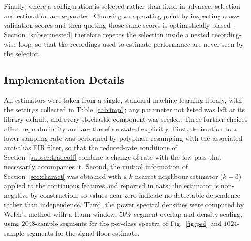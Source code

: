 Finally, where a configuration is selected rather than fixed in advance, selection
and estimation are separated. Choosing an operating point by inspecting
cross-validation scores and then quoting those same scores is optimistically
biased~\cite{qi2019cv}; Section~\ref{subsec:nested} therefore repeats the
selection inside a nested recording-wise loop, so that the recordings used to
estimate performance are never seen by the selector.

\subsection{Implementation Details}
\label{subsec:impl}
All estimators were taken from a single, standard machine-learning library, with
the settings collected in Table~\ref{tab:impl}; any parameter not listed was left
at its library default, and every stochastic component was seeded. Three further
choices affect reproducibility and are therefore stated explicitly. First,
decimation to a lower sampling rate was performed by polyphase resampling with
the associated anti-alias FIR filter, so that the reduced-rate conditions of
Section~\ref{subsec:tradeoff} combine a change of rate with the low-pass that
necessarily accompanies it. Second, the mutual information of
Section~\ref{sec:charact} was obtained with a $k$-nearest-neighbour estimator
($k=3$) applied to the continuous features and reported in nats; the estimator is
non-negative by construction, so values near zero indicate no detectable
dependence rather than independence. Third, the power spectral densities were
computed by Welch's method with a Hann window, $50\%$ segment overlap and
density scaling, using $2048$-sample segments for the per-class spectra of
Fig.~\ref{fig:psd} and $1024$-sample segments for the signal-floor estimate.

